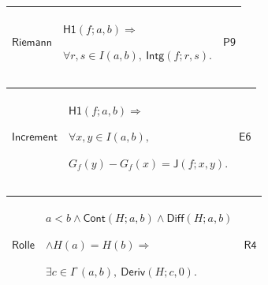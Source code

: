 \documentclass[11pt]{amsart}
\newlength{\FTCThreeColumnBody}
\begin{document}
{\begin{tabular}{|@{}>{\centering\arraybackslash}m{0.251968\FTCThreeColumnBody}|>{\centering\arraybackslash}m{0.590551\FTCThreeColumnBody}|>{\centering\arraybackslash}m{0.157480\FTCThreeColumnBody}|}
\end{tabular}%
\par\setlength{\parskip}{0pt}\nointerlineskip
\noindent
\begin{tabular}{|@{}>{\centering\arraybackslash}m{0.251968\FTCThreeColumnBody}|>{\centering\arraybackslash}m{0.590551\FTCThreeColumnBody}|>{\centering\arraybackslash}m{0.157480\FTCThreeColumnBody}|}\hline
\hypertarget{lem:Riemann}{$\displaystyle \textsf{Riemann}$} & $\displaystyle \textsf{H1}(f;a,b)\Rightarrow$\par
$\displaystyle \forall r,s\in I(a,b),\ \textsf{Intg}(f;r,s).$ & \hyperlink{proof:P9}{$\displaystyle \textsf{P9}$}\\ \hline
\end{tabular}%
\par\setlength{\parskip}{0pt}\nointerlineskip
\noindent
\begin{tabular}{|@{}>{\centering\arraybackslash}m{0.251968\FTCThreeColumnBody}|>{\centering\arraybackslash}m{0.590551\FTCThreeColumnBody}|>{\centering\arraybackslash}m{0.157480\FTCThreeColumnBody}|}\hline
\hypertarget{lem:Increment}{$\displaystyle \textsf{Increment}$} & $\displaystyle \textsf{H1}(f;a,b)\Rightarrow$\par
$\displaystyle \forall x,y\in I(a,b),$\par
$\displaystyle G_f(y)-G_f(x)=\textsf{J}(f;x,y).$ & \hyperlink{proof:E6}{$\displaystyle \textsf{E6}$}\\ \hline
\end{tabular}%
\par\setlength{\parskip}{0pt}\nointerlineskip
\noindent
\begin{tabular}{|@{}>{\centering\arraybackslash}m{0.251968\FTCThreeColumnBody}|>{\centering\arraybackslash}m{0.590551\FTCThreeColumnBody}|>{\centering\arraybackslash}m{0.157480\FTCThreeColumnBody}|}\hline
\hypertarget{lem:Rolle}{$\displaystyle \textsf{Rolle}$} & $\displaystyle a<b\land\textsf{Cont}(H;a,b)\land\textsf{Diff}(H;a,b)$\par
$\displaystyle \land H(a)=H(b)\Rightarrow$\par
$\displaystyle \exists c\in I^\circ(a,b),\ \textsf{Deriv}(H;c,0).$ & \hyperlink{proof:R4}{$\displaystyle \textsf{R4}$}\\ \hline
\end{tabular}%
\par\setlength{\parskip}{0pt}\nointerlineskip
\noindent
\begin{tabular}{|@{}>{\centering\arraybackslash}m{0.251968\FTCThreeColumnBody}|>{\centering\arraybackslash}m{0.590551\FTCThreeColumnBody}|>{\centering\arraybackslash}m{0.157480\FTCThreeColumnBody}|}\hline

\end{tabular}}
\end{document}
